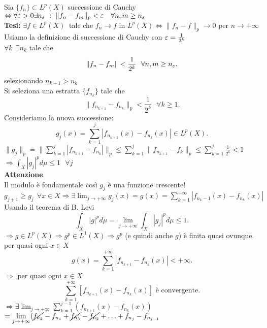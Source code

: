 \documentclass[12px]{article}
\begin{document}
\begin{dimo}
	Sia $\{f_n\}\subset L^p(X)$ successione di Cauchy\\
	 $ \Leftrightarrow \forall \varepsilon > 0 \exists n_\varepsilon\ :\ \|f_n - f_m\|_p < \varepsilon \ \ \ \forall n,m\geq n_\varepsilon$ \\
	 \textbf{Tesi:} $\exists f\in L^p(X)\ $ tale che  $f_n \rightarrow f $ in $L^p (X) \Leftrightarrow \|f_n-f\|_p \rightarrow 0$ per $ n \rightarrow +\infty$ \\
	 Usiamo la definizione di successione di Cauchy con $\varepsilon = \frac {1}{2^k}$\\
	  $\forall k \ \ \exists n_k$ tale che 
	   \[
		   \|f_n - f_m \| < \frac {1}{2^k} \ \ \forall n,m\geq n_\varepsilon
	  .\] 
	  selezionando $n_{k+1}> n_k$\\
	  Si seleziona una estratta  $\{f_{n_k}\}$ tale che\\
	   \[
		   \|f_{n_{k+1}}-f_{n_k}\|_p < \frac {1}{2^k} \ \ \ \forall k\geq 1
	  .\] 
	  Consideriamo la nuova successione:
	  \[
	  g_j(x) = \sum^{j}_{k = 1} |f_{n_{k+1}}(x) - f_{n_k}(x)|\in L^p(X)
	  .\] 
	  $\displaystyle\|g_j\|_p = \|\sum^{j}_{k = 1}|f_{n_{k+1}} - f_{n_k}|\|_p\leq \sum^{j}_{k=1}\|f_{n_{k+1}} - f_k\|_p\leq \sum^{j}_{k=1}\frac{1}{2^k} < 1$\\
	  $\displaystyle \Rightarrow  \int_X|g_j|^pd\mu\leq 1 \ \ \ \forall j$ \\
	  \textbf{Attenzione}\\
	  Il modulo è fondamentale così $g_j$ è una funzione crescente! \\$\displaystyle g_{j+1} \geq g_j \ \ \forall x\in X \Rightarrow \exists \lim_{ j \rightarrow+\infty}g_j(x) = g(x) = \sum^{+\infty}_{k = 1}|f_{n_k-1}(x) - f_{n_k}(x)|$\\
	  Usando il teorema di B. Levi
	  \[
		  \int_X|g|^pd\mu = \lim_{j \rightarrow +\infty}\int_X |g_j|^p d\mu \leq 1
	  .\] 
	  $\displaystyle \Rightarrow  g\in L^p(X) \Rightarrow  g^p\in L^1(X) \Rightarrow g^p $ (e quindi anche $g$) è finita quasi ovunque.\\
	 per quasi ogni  $x\in X$
	  \[
		  g(x) = \sum^{+\infty}_{k =1} |f_{n_{k+1}} - f_{n_k}(x)| < +\infty
	 .\] 
	 $ \Rightarrow  $ per quasi ogni $x\in X$
	  \[
		  \sum^{+\infty}_{k = 1}[f_{n_{k+1}}(x) - f_{n_k}(x)] \text{ è convergente}
	 .\] 
	 $ \displaystyle\Rightarrow  \exists \lim_{j \rightarrow+\infty} \sum^{j-1}_{k=1}(f_{n_{k+1}}(x)-f_{n_k}(x))$ \\
 $ \displaystyle = \lim_{ j \rightarrow+\infty} (\cancel{f_{n_2}} - f_{n_1} + \cancel{f_{n_3}} - \cancel{f_{n_2}} + \ldots + f_{n_j} - f_{n_{j - 1}}$\\

\end{dimo}
\end{document}
